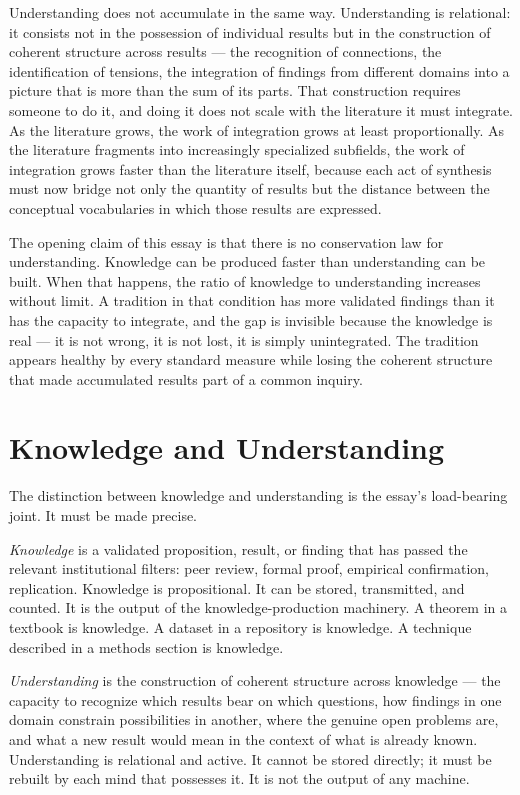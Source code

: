 Understanding does not accumulate in the same way. Understanding is relational:
it consists not in the possession of individual results but in the construction
of coherent structure across results --- the recognition of connections, the
identification of tensions, the integration of findings from different domains
into a picture that is more than the sum of its parts. That construction requires
someone to do it, and doing it does not scale with the literature it must integrate.
As the literature grows, the work of integration grows at least proportionally.
As the literature fragments into increasingly specialized subfields, the work
of integration grows faster than the literature itself, because each act of
synthesis must now bridge not only the quantity of results but the distance
between the conceptual vocabularies in which those results are expressed.

The opening claim of this essay is that there is no conservation law for
understanding. Knowledge can be produced faster than understanding can be
built. When that happens, the ratio of knowledge to understanding increases
without limit. A tradition in that condition has more validated findings than
it has the capacity to integrate, and the gap is invisible because the knowledge
is real --- it is not wrong, it is not lost, it is simply unintegrated. The
tradition appears healthy by every standard measure while losing the coherent
structure that made accumulated results part of a common inquiry.

\section{Knowledge and Understanding}

The distinction between knowledge and understanding is the essay's load-bearing
joint. It must be made precise.

\emph{Knowledge} is a validated proposition, result, or finding that has passed
the relevant institutional filters: peer review, formal proof, empirical
confirmation, replication. Knowledge is propositional. It can be stored,
transmitted, and counted. It is the output of the knowledge-production machinery.
A theorem in a textbook is knowledge. A dataset in a repository is knowledge.
A technique described in a methods section is knowledge.

\emph{Understanding} is the construction of coherent structure across knowledge
--- the capacity to recognize which results bear on which questions, how findings
in one domain constrain possibilities in another, where the genuine open problems
are, and what a new result would mean in the context of what is already known.
Understanding is relational and active. It cannot be stored directly; it must
be rebuilt by each mind that possesses it. It is not the output of any machine.

